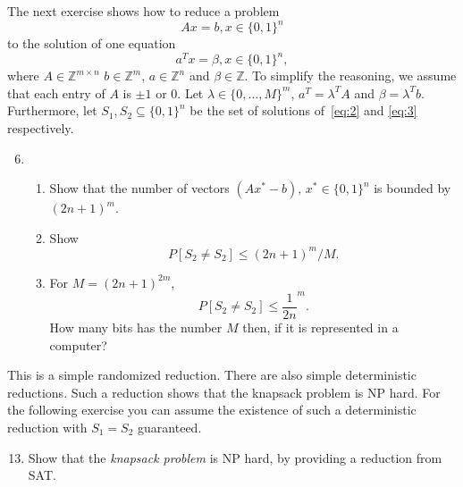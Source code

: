 \documentclass[11pt,a4paper]{article}
\begin{document}
\noindent 
The next exercise shows how to reduce a problem 
\begin{equation} 
  \label{eq:2}
  A x = b, x ∈ \{0,1\}^n   
\end{equation}
to the solution of one equation
\begin{equation}
  \label{eq:3}
   a^T x = β, x ∈ \{0,1\}^n,   
 \end{equation}
 where $A ∈ℤ^{m ×n}$ $b ∈ℤ^m$, $a ∈ℤ^n$ and $β ∈ℤ$. To simplify the reasoning, we assume that each entry of $A$ is $± 1$ or $0$.
 Let $λ ∈ \{ 0,\dots,M\} ^m$,  $a^T = λ^T A$ and $β = λ^T b$. Furthermore, let $S_1, S_2 ⊆ \{0,1\}^n$ be the set of solutions  of~\eqref{eq:2} and \eqref{eq:3} respectively.

 
 \begin{enumerate}
   \setcounter{enumi}{5}
   \begin{enumerate}
 \item  Show that $S_1 ⊆ S_2$ holds.
 \item An element $x^* ∈ \{0,1\}^n$ belongs to $S_2 ⧹S_1$ if and only if $λ ⊥ (A x^* -b)$.
 \item Suppose that $λ $ is chosen i.i.d. at random from $\{ 0,\dots,M\}$ and that $x^* ∈ \{0,1\}^n ⧹S_1$. Show that
   \begin{displaymath}
     P\left[ λ ⊥ (A x^* -b) \right] ≤ 1/M. 
   \end{displaymath}
   
   \end{enumerate} 
   
 \item 
 \begin{enumerate}
 \item Show that the number of vectors $(A x^* -b), \, x^* ∈\{0,1\}^n$ is bounded by $(2 n +1)^m$.
 \item Show 
   \begin{displaymath}
     P \left[ S_2 ≠ S_2\right] ≤ (2 n +1)^m / M. 
   \end{displaymath}
 \item For $M = (2 n +1)^{2m}$,
   \begin{displaymath}
     P \left[ S_2 ≠ S_2\right] ≤ \frac{1}{2n}^m. 
   \end{displaymath}
   How many bits has the number $M$ then, if it is represented in a computer?
   \end{enumerate}
   \end{enumerate}

 \noindent 
 This is a simple randomized reduction. There are also simple deterministic reductions. Such a reduction shows that the knapsack problem is NP hard. For the following exercise you can assume the existence of such a deterministic reduction with $S_1 = S_2$ guaranteed.
 \begin{enumerate}
   \setcounter{enumi}{12}
\item    Show that the \emph{knapsack problem} is NP hard, by providing a reduction from SAT. 
 \end{enumerate}
 
 

%
%


 
\end{document}
